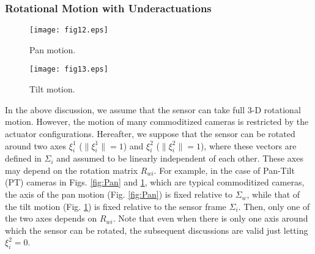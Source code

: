 \documentclass[conference,letterpaper]{ieeeconf}
\newcommand{\ewi}{R_{wi}}
\begin{document}
\subsubsection*{Rotational Motion with Underactuations}



\begin{figure}[t]
\begin{center}
\begin{minipage}{4cm}
\begin{center}
\texttt{[image: fig12.eps]}
\caption{Pan motion.}
\label{fig:Pan}
\end{center}
\end{minipage}
\hspace{.2cm}
\begin{minipage}{4cm}
\begin{center}
\texttt{[image: fig13.eps]}
\caption{Tilt motion.}
\label{fig:Tilt}
\end{center}
\end{minipage}
\end{center}
\end{figure}




In the above discussion, we assume that the sensor can take full 3-D
rotational motion.
However, the motion of many commoditized cameras is restricted by
the actuator configurations.
Hereafter, we suppose that the sensor can be rotated 
around two axes $\xi^1_i$ ($\|\xi^1_i\|=1$) and $\xi_i^2$ ($\|\xi^2_i\|=1$),
where these vectors are defined in $\Sigma_i$ and assumed to be
linearly independent of each other.
These axes may depend on the rotation matrix $\ewi$.
For example, in the case of
Pan-Tilt (PT) cameras in Figs. \ref{fig:Pan} and \ref{fig:Tilt}, which are
typical commoditized cameras, 
the axis of the pan motion (Fig. \ref{fig:Pan}) 
is fixed relative to $\Sigma_w$, 
while that of the tilt motion (Fig. \ref{fig:Tilt}) is fixed
relative to the sensor frame $\Sigma_i$.
Then, only one of the two axes depends on $\ewi$.
Note that even when there is only one axis around which the sensor can be rotated, 
the subsequent discussions are valid just letting $\xi_i^2=0$.
\end{document}
